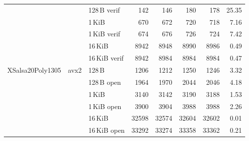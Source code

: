 \begin{table}[H]
\begin{tabular}{lllrrrrr}
 &      & 128\,B verif  & 142
                        & 146
                        & 180
                        & 178
                        & 25.35 \\

 &      & 1\,KiB        & 670
                        & 672
                        & 720
                        & 718
                        & 7.16 \\

 &      & 1\,KiB verif  & 674
                        & 676
                        & 726
                        & 724
                        & 7.42 \\

 &      & 16\,KiB       & 8942
                        & 8948
                        & 8990
                        & 8986
                        & 0.49 \\

 &      & 16\,KiB verif & 8942
                        & 8984
                        & 8984
                        & 8984
                        & 0.47 \\

      \midrule
    \multirow{6}{*}{XSalsa20Poly1305}
 &  \multirow{6}{*}{avx2}
        & 128\,B        & 1206
                        & 1212
                        & 1250
                        & 1246
                        & 3.32 \\

 &      & 128\,B open   & 1964
                        & 1970
                        & 2044
                        & 2046
                        & 4.18 \\

 &      & 1\,KiB        & 3140
                        & 3142
                        & 3190
                        & 3188
                        & 1.53 \\

 &      & 1\,KiB open   & 3900
                        & 3904
                        & 3988
                        & 3988
                        & 2.26 \\

 &      & 16\,KiB       & 32598
                        & 32574
                        & 32604
                        & 32602
                        & 0.01 \\

 &      & 16\,KiB open  & 33292
                        & 33274
                        & 33358
                        & 33362
                        & 0.21 \\


\end{tabular}
\end{table}
